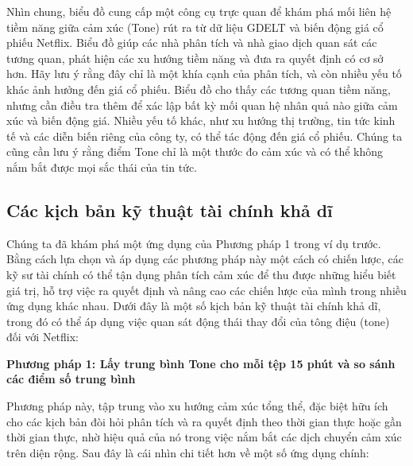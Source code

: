 Nhìn chung, biểu đồ cung cấp một công cụ trực quan để khám phá mối liên hệ tiềm năng giữa cảm xúc (Tone) rút ra từ dữ liệu GDELT và biến động giá cổ phiếu Netflix. Biểu đồ giúp các nhà phân tích và nhà giao dịch quan sát các tương quan, phát hiện các xu hướng tiềm năng và đưa ra quyết định có cơ sở hơn. Hãy lưu ý rằng đây chỉ là một khía cạnh của phân tích, và còn nhiều yếu tố khác ảnh hưởng đến giá cổ phiếu. Biểu đồ cho thấy các tương quan tiềm năng, nhưng cần điều tra thêm để xác lập bất kỳ mối quan hệ nhân quả nào giữa cảm xúc và biến động giá. Nhiều yếu tố khác, như xu hướng thị trường, tin tức kinh tế và các diễn biến riêng của công ty, có thể tác động đến giá cổ phiếu. Chúng ta cũng cần lưu ý rằng điểm Tone chỉ là một thước đo cảm xúc và có thể không nắm bắt được mọi sắc thái của tin tức.

\subsection{Các kịch bản kỹ thuật tài chính khả dĩ}

Chúng ta đã khám phá một ứng dụng của Phương pháp 1 trong ví dụ trước. Bằng cách lựa chọn và áp dụng các phương pháp này một cách có chiến lược, các kỹ sư tài chính có thể tận dụng phân tích cảm xúc để thu được những hiểu biết giá trị, hỗ trợ việc ra quyết định và nâng cao các chiến lược của mình trong nhiều ứng dụng khác nhau. Dưới đây là một số kịch bản kỹ thuật tài chính khả dĩ, trong đó có thể áp dụng việc quan sát động thái thay đổi của tông điệu (tone) đối với Netflix:

\textbf{Phương pháp 1: Lấy trung bình Tone cho mỗi tệp 15 phút và so sánh các điểm số trung bình}

Phương pháp này, tập trung vào xu hướng cảm xúc tổng thể, đặc biệt hữu ích cho các kịch bản đòi hỏi phân tích và ra quyết định theo thời gian thực hoặc gần thời gian thực, nhờ hiệu quả của nó trong việc nắm bắt các dịch chuyển cảm xúc trên diện rộng. Sau đây là cái nhìn chi tiết hơn về một số ứng dụng chính:


